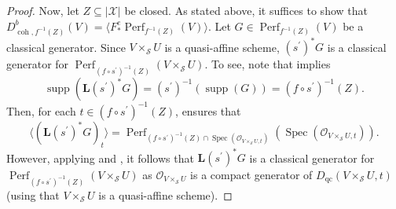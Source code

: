 \documentclass[11pt]{amsart}
\theoremstyle{plain}
\theoremstyle{definition}
\numberwithin{equation}{section}
\numberwithin{theorem}{section}
\begin{document}
\begin{proof}
    Now, let $Z\subseteq |\mathcal{X}|$ be closed. 
    As stated above, it suffices to show that $D^b_{\operatorname{coh},f^{-1}(Z)}(V) = \langle F_\ast^e \operatorname{Perf}_{f^{-1}(Z)}(V) \rangle$. 
    Let $G\in \operatorname{Perf}_{f^{-1}(Z)}(V)$ be a classical generator. 
    Since $V\times_\mathcal{S} U$ is a quasi-affine scheme, $(s^\prime)^\ast G$ is a classical generator for $\operatorname{Perf}_{(f\circ s^\prime)^{-1}(Z)} (V\times_\mathcal{S} U)$. 
    To see, note that \cite[Lemma 4.8(3)]{Hall/Rydh:2017} implies
    \begin{displaymath}
        \operatorname{supp}(\mathbf{L} (s^\prime)^\ast G)= (s^\prime)^{-1}(\operatorname{supp}(G))=(f\circ s^\prime)^{-1}(Z).
    \end{displaymath}
    Then, for each $t\in (f\circ s^\prime)^{-1}(Z)$, \cite[Lemma 1.2]{Neeman:1992} ensures that
    \begin{displaymath}
        \langle (\mathbf{L} (s^\prime)^\ast G)_t \rangle = \operatorname{Perf}_{(f\circ s^\prime)^{-1}(Z) \cap \operatorname{Spec}(\mathcal{O}_{V\times_\mathcal{S} U,t})} (\operatorname{Spec}(\mathcal{O}_{V\times_\mathcal{S} U,t})).
    \end{displaymath}
    However, applying  and \cite[Theorem 3.6]{Letz:2021}, it follows that $\mathbf{L} (s^\prime)^\ast G$ is a classical generator for $\operatorname{Perf}_{(f\circ s^\prime)^{-1}(Z)} (V\times_\mathcal{S} U)$ as $\mathcal{O}_{V\times_\mathcal{S} U}$ is a compact generator of $D_{\operatorname{qc}}(V\times_\mathcal{S} U,t)$ (using that $V\times_\mathcal{S} U$ is a quasi-affine scheme).


\end{proof}
\end{document}
